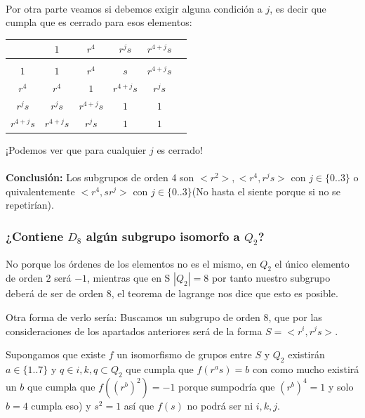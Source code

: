 \documentclass[12pt]{article}
\begin{document}
\paragraph{}
Por otra parte veamos si debemos exigir alguna condición a $j$,
es decir que cumpla que es cerrado para esos elementos: 
\begin{center}
\begin{tabular}{c|c c c c c}
     & $ 1            $ & $  r^4         $ & $  r^js     $ & $ r^{4+j} s $\\ 
    \hline \\  
    $ 1    $ & $ 1             $ & $        r^4   $ & $ s      $ & $ r^{4+j} s $\\ 
    $r^4   $ & $ r^4           $ & $1             $ & $ r^{4+j} s  $ & $ r^{j}s     $\\ 
    $r^js     $ & $ r^js             $ & $r^{4+j} s $ & $    1   $ & $  1  $\\
    $r^{4+j} s $ & $ r^{4+j} s         $ & $ r^js            $ & $ 1    $ & $ 1$

\end{tabular}
\end{center}
¡Podemos ver que para cualquier $j$  es cerrado!
\paragraph{}
\textbf{Conclusión:}
Los subgrupos de orden 4 son $<r^2>, <r^4,r^js>$ con $j \in \{0..3\}$ o quivalentemente $<r^4,sr^j>$ con $j \in \{0..3\}$(No hasta el siente porque si no se repetirían).

\subsubsection*{¿Contiene $D_8$ algún subgrupo isomorfo a $Q_2$?}

No porque los órdenes de los elementos no es el mismo, en $Q_2$ el único elemento de orden $2$ 
será $-1$, mientras que en S
$|Q_2| = 8$ por tanto nuestro subgrupo deberá de ser de orden 8, el teorema de lagrange nos 
dice que esto es posible. 

Otra forma de verlo sería:  
Buscamos un subgrupo de orden 8, que por las consideraciones de los apartados anteriores
será de la forma $S = <r^i, r^js>$.

Supongamos que existe $f$ un isomorfismo de grupos entre $S$ y $Q_2$
existirán $a \in \{1..7\}$ y $ q \in {i,k,q} \subset Q_2$ que cumpla que $f(r^a s) = b$ 
con como mucho existirá un $b$ que cumpla que  $f((r^b)^2) = -1$ porque sumpodría que $(r^b)^4 = 1$ y solo $b=4$ cumpla eso) 
y $s^2 = 1$ así que $f(s)$ no podrá ser ni $i,k,j.$ 
\end{document}
